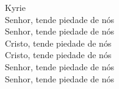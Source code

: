 \textcolor{VioletRed1}{Kyrie}
\vspace{0.2cm} \\
\VbarRed{} Senhor, tende piedade de nós \\
\RbarRed{} Senhor, tende piedade de nós
\vspace{0.1cm} \\
\VbarRed{} Cristo, tende piedade de nós \\
\RbarRed{} Cristo, tende piedade de nós
\vspace{0.1cm} \\
\VbarRed{} Senhor, tende piedade de nós \\
\RbarRed{} Senhor, tende piedade de nós
\vspace{0.2cm} \\
